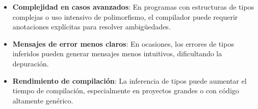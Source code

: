 \documentclass{article}
\begin{document}
  \begin{itemize}
    \item \textbf{Complejidad en casos avanzados}: En programas con estructuras de tipos complejas o uso intensivo de polimorfismo, el compilador puede requerir anotaciones explícitas para resolver ambigüedades.

    \item \textbf{Mensajes de error menos claros}: En ocasiones, los errores de tipos inferidos pueden generar mensajes menos intuitivos, dificultando la depuración.

    \item \textbf{Rendimiento de compilación}: La inferencia de tipos puede aumentar el tiempo de compilación, especialmente en proyectos grandes o con código altamente genérico.
  \end{itemize}
\end{document}
